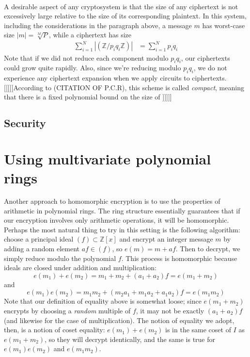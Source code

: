 \documentclass[11pt]{report}
\newcommand{\Z}{\mathbb{Z}}
\newcommand{\Zx}{\mathbb{Z}[x]}
\begin{document}
\

A desirable aspect of any cryptosystem is that the size of any ciphertext is not excessively large relative to the size of its corresponding plaintext. In this system, including the considerations in the paragraph above, a message $m$ has worst-case size $|m|=\sqrt[M]{P}$, while a ciphertext has size
\begin{align*}
\sum_{i=1}^N\left|(\Z/p_iq_i\Z)\right| &= \sum_{i=1}^Np_iq_i
\end{align*}
Note that if we did not reduce each component modulo $p_iq_i$, our ciphertexts could grow quite rapidly. Also, since we're reducing modulo $p_iq_i$, we do not experience any ciphertext expansion when we apply circuits to ciphertexts. [[[[[According to (CITATION OF P.C.R), this scheme is called \emph{compact}, meaning that there is a fixed polynomial bound on the size of ]]]]]


\subsection{Security}
\label{sec:cbd_security}



\section{Using multivariate polynomial rings}
\label{sec:multicrypt}

Another approach to homomorphic encryption is to use the properties of arithmetic in polynomial rings. The ring structure essentially guarantees that if our encryption involves only arithmetic operations, it will be homomorphic. Perhaps the most natural thing to try in this setting is the following algorithm: choose a principal ideal $(f)\subset \Zx$ and encrypt an integer message $m$ by adding a random element $af\in (f)$, so $e(m) = m+af$. Then to decrypt, we simply reduce modulo the polynomial $f$. This process is homomorphic because ideals are closed under addition and multiplication:
\[e(m_1)+e(m_2) = m_1+m_2+(a_1+a_2)f= e(m_1+m_2)\]
and
\[e(m_1)e(m_2) = m_1m_2+(m_2a_1+m_1a_2+a_1a_2)f = e(m_1m_2)\]
Note that our definition of equality above is somewhat loose; since $e(m_1+m_2)$ encrypts by choosing a \emph{random} multiple of $f$, it may not be exactly $(a_1+a_2)f$ (and likewise for the case of multiplication). The notion of equality we adopt, then, is a notion of coset equality: $e(m_1)+e(m_2)$ is in the same coset of $I$ as $e(m_1+m_2)$, so they will decrypt identically, and the same is true for $e(m_1)e(m_2)$ and $e(m_1m_2)$.
\end{document}
